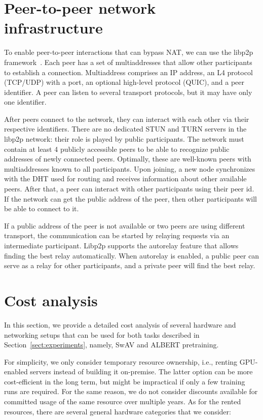 \section{Peer-to-peer network infrastructure}\label{appendix:p2p}

To enable peer-to-peer interactions that can bypass NAT, we can use the libp2p framework~\cite{libp2p}. Each peer has a set of multiaddresses that allow other participants to establish a connection. Multiaddress comprises an IP address, an L4 protocol (TCP/UDP) with a port, an optional high-level protocol (QUIC), and a peer identifier. A peer can listen to several transport protocols, but it may have only one identifier.

After peers connect to the network, they can interact with each other via their respective identifiers. There are no dedicated STUN and TURN servers in the libp2p network: their role is played by public participants. The network must contain at least 4 publicly accessible peers to be able to recognize public addresses of newly connected peers. Optimally, these are well-known peers with multiaddresses known to all participants. Upon joining, a new node synchronizes with the DHT used for routing and receives information about other available peers. After that, a peer can interact with other participants using their peer id. If the network can get the public address of the peer, then other participants will be able to connect to it.

If a public address of the peer is not available or two peers are using different transport, the communication can be started by relaying requests via an intermediate participant.
Libp2p supports the autorelay feature that allows finding the best relay automatically. When autorelay is enabled, a public peer can serve as a relay for other participants, and a private peer will find the best relay.

\vspace{-2pt}
\section{Cost analysis}\label{appendix:cost_analysis}

In this section, we provide a detailed cost analysis of several hardware and networking setups that can be used for both tasks described in Section~\ref{sect:experiments}, namely, SwAV and ALBERT pretraining.

For simplicity, we only consider temporary resource ownership, i.e., renting GPU-enabled servers instead of building it on-premise. The latter option can be more cost-efficient in the long term, but might be impractical if only a few training runs are required. For the same reason, we do not consider discounts available for committed usage of the same resource over multiple years. As for the rented resources, there are several general hardware categories that we consider:

